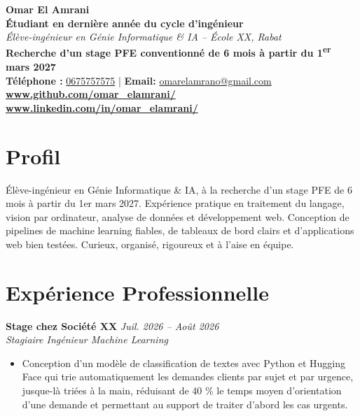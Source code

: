 \documentclass[11pt,a4paper]{extarticle}
\let\oldtextbf\textbf
\renewcommand{\textbf}[1]{\textcolor{primary}{\oldtextbf{#1}}}
\begin{document}
\pagestyle{empty}
\color{bodytext}

\noindent
\begin{minipage}[c]{\textwidth}
    \centering
    {\LARGE \textbf{Omar El Amrani}}\\[1pt]
    {\large \textbf{Étudiant en dernière année du cycle d'ingénieur}}\\[1pt]
    {\normalsize \textit{Élève-ingénieur en Génie Informatique \& IA -- École XX, Rabat}}\\[1pt]
    {\normalsize \textbf{Recherche d'un stage PFE conventionné de 6 mois à partir du 1\textsuperscript{er} mars 2027}}\\[2pt]
    \footnotesize
    \textbf{Téléphone :} \href{tel:0675757575}{0675757575} \quad|\quad
    \textbf{Email:} \href{mailto:omarelamrano@gmail.com}{omarelamrano@gmail.com} \\[3pt]
    {\large \textbf{\href{https://www.github.com/omar_elamrani/}{www.github.com/omar\_elamrani/}} \quad\textbar\quad \textbf{\href{https://www.linkedin.com/in/omar_elamrani/}{www.linkedin.com/in/omar\_elamrani/}}}
\end{minipage}

\vspace{1pt}

\section*{Profil}
Élève-ingénieur en Génie Informatique \& IA, à la recherche d'un stage PFE de 6 mois à partir du 1er mars 2027. Expérience pratique en traitement du langage, vision par ordinateur, analyse de données et développement web. Conception de pipelines de machine learning fiables, de tableaux de bord clairs et d'applications web bien testées. Curieux, organisé, rigoureux et à l'aise en équipe.

\section*{Expérience Professionnelle}

\textbf{Stage chez Société XX} \hfill \textit{Juil. 2026 -- Août 2026} \\
\textit{Stagiaire Ingénieur Machine Learning}
\begin{itemize}
\item Conception d'un modèle de classification de textes avec Python et Hugging Face qui trie automatiquement les demandes clients par sujet et par urgence, jusque-là triées à la main, réduisant de 40 \% le temps moyen d'orientation d'une demande et permettant au support de traiter d'abord les cas urgents.
\end{itemize}
\end{document}
